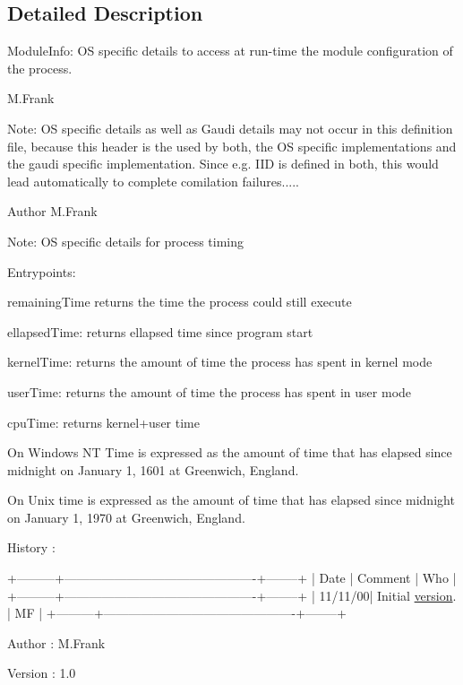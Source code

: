 \subsection{Detailed Description}
ModuleInfo: OS specific details to access at run-\/time the module configuration of the process.

M.Frank

Note: OS specific details as well as Gaudi details may not occur in this definition file, because this header is the used by both, the OS specific implementations and the gaudi specific implementation. Since e.g. IID is defined in both, this would lead automatically to complete comilation failures.....

\begin{DoxyAuthor}{Author}
M.Frank
\end{DoxyAuthor}
Note: OS specific details for process timing

Entrypoints:
\begin{DoxyItemize}
\item remainingTime returns the time the process could still execute
\item ellapsedTime: returns ellapsed time since program start
\item kernelTime: returns the amount of time the process has spent in kernel mode
\item userTime: returns the amount of time the process has spent in user mode
\item cpuTime: returns kernel+user time
\end{DoxyItemize}

On Windows NT Time is expressed as the amount of time that has elapsed since midnight on January 1, 1601 at Greenwich, England.

On Unix time is expressed as the amount of time that has elapsed since midnight on January 1, 1970 at Greenwich, England.

History :


\begin{DoxyPre}
    +---------+----------------------------------------------+--------+
    |    Date |                 Comment                      | Who    |
    +---------+----------------------------------------------+--------+
    | 11/11/00| Initial \hyperlink{namespaceversion}{version}.                             | MF     |
    +---------+----------------------------------------------+--------+
    \end{DoxyPre}
 \begin{DoxyAuthor}{Author}
: M.Frank 
\end{DoxyAuthor}
\begin{DoxyVersion}{Version}
: 1.0 
\end{DoxyVersion}


